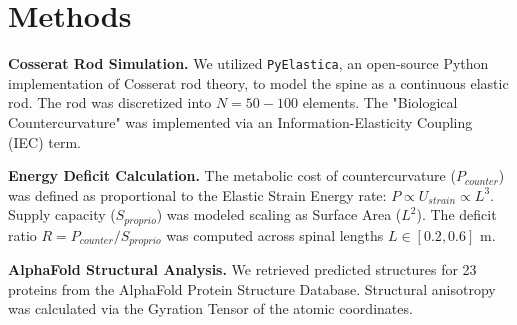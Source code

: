 \documentclass[11pt]{article}
\begin{document}
\section*{Methods}

\textbf{Cosserat Rod Simulation.} We utilized \texttt{PyElastica}\cite{pyelastica_zenodo}, an open-source Python implementation of Cosserat rod theory, to model the spine as a continuous elastic rod. The rod was discretized into $N=50-100$ elements. The "Biological Countercurvature" was implemented via an Information-Elasticity Coupling (IEC) term.

\textbf{Energy Deficit Calculation.} The metabolic cost of countercurvature ($P_{counter}$) was defined as proportional to the Elastic Strain Energy rate: $P \propto U_{strain} \propto L^3$. Supply capacity ($S_{proprio}$) was modeled scaling as Surface Area ($L^2$). The deficit ratio $R = P_{counter} / S_{proprio}$ was computed across spinal lengths $L \in [0.2, 0.6]$ m.

\textbf{AlphaFold Structural Analysis.} We retrieved predicted structures for 23 proteins from the AlphaFold Protein Structure Database\cite{jumper2021alphafold}. Structural anisotropy was calculated via the Gyration Tensor of the atomic coordinates.



\end{document}
